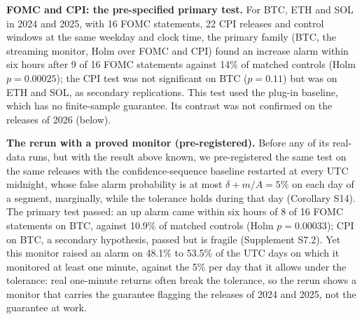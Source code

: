 \documentclass[
]{article}
\begin{document}
\textbf{FOMC and CPI: the pre-specified primary test.} For BTC, ETH and
SOL in 2024 and 2025, with 16 FOMC statements, 22 CPI releases and
control windows at the same weekday and clock time, the primary family
(BTC, the streaming monitor, Holm over FOMC and CPI) found an increase
alarm within six hours after 9 of 16 FOMC statements against 14\% of
matched controls (Holm \(p = 0.00025\)); the CPI test was not
significant on BTC (\(p = 0.11\)) but was on ETH and SOL, as secondary
replications. This test used the plug-in baseline, which has no
finite-sample guarantee. Its contrast was not confirmed on the releases
of 2026 (below).

\textbf{The rerun with a proved monitor (pre-registered).} Before any of
its real-data runs, but with the result above known, we pre-registered
the same test on the same releases with the confidence-sequence baseline
restarted at every UTC midnight, whose false alarm probability is at
most \(\delta + m/A = 5\%\) on each day of a segment, marginally, while
the tolerance holds during that day (Corollary S14). The primary test
passed: an up alarm came within six hours of 8 of 16 FOMC statements on
BTC, against 10.9\% of matched controls (Holm \(p = 0.00033\)); CPI on
BTC, a secondary hypothesis, passed but is fragile (Supplement S7.2).
Yet this monitor raised an alarm on 48.1\% to 53.5\% of the UTC days on
which it monitored at least one minute, against the 5\% per day that it
allows under the tolerance: real one-minute returns often break the
tolerance, so the rerun shows a monitor that carries the guarantee
flagging the releases of 2024 and 2025, not the guarantee at work.
\end{document}
